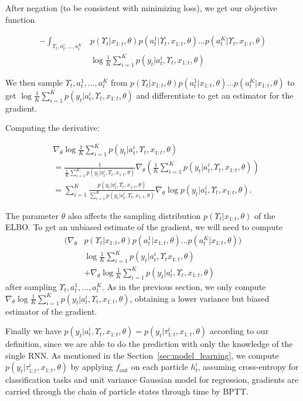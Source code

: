 \documentclass[letterpaper]{article} %
\begin{document}
After negation (to be consistent with minimizing loss), we get our objective function

\begin{align*}
-\int_{\Upsilon_{t},a_t^i,\ldots,a_t^K}&p(\Upsilon_{t}|x_{1:t},\theta)p(a_t^1|\Upsilon_{t},x_{1:t},\theta)\ldots p(a_t^K|\Upsilon_{t},x_{1:t},\theta)\\
&\log \frac{1}{K}\sum_{i=1}^K  p(y_t|a_t^i,\Upsilon_{t},x_{1:t},\theta)
\end{align*}

We then sample $\Upsilon_{t},a_t^1,\ldots,a_t^K$ from $p(\Upsilon_{t}|x_{1:t},\theta)p(a_t^1|x_{1:t},\theta)\ldots p(a_t^K|x_{1:t},\theta)$ to get $\log \frac{1}{K}\sum_{i=1}^K  p(y_t|a_t^i,\Upsilon_{t},x_{1:t},\theta)$ and differentiate to get an estimator for the gradient.

Computing the derivative:

\begin{align*}
	&\nabla_{\theta}\log \frac{1}{K}\sum_{i=1}^K  p(y_t|a_t^i,\Upsilon_{t},x_{1:t},\theta)\\
	&=\frac{1}{\frac{1}{K}\sum_{i=1}^K  p(y_t|a_t^i,\Upsilon_{t},x_{1:t},\theta)}\nabla_{\theta}(\frac{1}{K}\sum_{i=1}^K  p(y_t|a_t^i,\Upsilon_{t},x_{1:t},\theta))\\
&=\sum_{i=1}^K\frac{p(y_t|a_t^i,\Upsilon_{t},x_{1:t},\theta)}{\sum_{i=1}^K  p(y_t|a_t^i,\Upsilon_{t},x_{1:t},\theta)}\nabla_{\theta}\log p(y_t|a_t^i,\Upsilon_{t},x_{1:t},\theta).
\end{align*}

The parameter $\theta$ also affects the sampling distribution $p(\Upsilon_{t}|x_{1:t},\theta)$ of the ELBO. To get an unbiased estimate of the gradient, we will need to compute 
\begin{align*}
(\nabla_\theta &p(\Upsilon_{t}|x_{1:t},\theta)p(a_t^1|x_{1:t},\theta)\ldots p(a_t^K|x_{1:t},\theta)) \\
&\log \frac{1}{K}\sum_{i=1}^K  p(y_t|a_t^i,\Upsilon_{t}x_{1:t},\theta) \\
&+ \nabla_{\theta}\log \frac{1}{K}\sum_{i=1}^K  p(y_t|a_t^i,\Upsilon_{t},x_{1:t},\theta)
\end{align*}
after sampling $\Upsilon_{t},a_t^1,\ldots,a_t^K$. As in the previous section, we only compute $\nabla_{\theta}\log \frac{1}{K}\sum_{i=1}^K  p(y_t|a_t^i,\Upsilon_{t},x_{1:t},\theta)$, obtaining a lower variance but biased estimator of the gradient.

Finally we have $p(y_t|a_t^i,\Upsilon_{t},x_{1:t},\theta)=p(y_t|\tau_{1:t}^i,x_{1:t},\theta)$ according to our definition, since we are able to do the prediction with only the knowledge of the single RNN. As mentioned in the Section~\ref{sec:model_learning}, we compute $p(y_t|\tau_{1:t}^i,x_{1:t},\theta)$ by applying $f_\mathrm{out}$ on each particle $h_t^i$, assuming cross-entropy for classification tasks and unit variance Gaussian model for regression, gradients are carried through the chain of particle states through time by BPTT.
\end{document}

